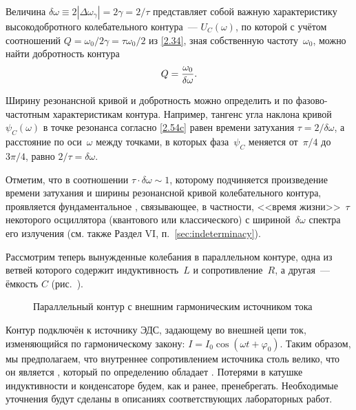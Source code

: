 Величина $\delta\omega\equiv2|\Delta\omega_{\gamma}|=2\gamma=2/\tau$
представляет собой важную характеристику высокодобротного колебательного
контура~---  $U_C(\omega)$, по которой с
учётом соотношений $Q=\omega_0/2\gamma=\tau\omega_0/2$ из \eqref{2.34}, зная
собственную частоту~$\omega_0$, можно найти добротность контура
\begin{equation}\eqmark{2.63}
Q=\dfrac{\omega_0}{\delta\omega}.
\end{equation}

Ширину резонансной кривой и добротность можно определить и по
фазово-частотным характеристикам контура. Например, тангенс угла наклона
кривой $\psi_C(\omega)$ в точке резонанса согласно \eqref{2.54c} равен времени
затухания $\tau=2/\delta\omega$, а расстояние по оси~$\omega$ между точками, в
которых фаза~$\psi_C$ меняется от~$\pi/4$ до~$3\pi/4$, равно
$2/\tau=\delta\omega$.

Отметим, что в соотношении $\tau\cdot\delta\omega\sim1$, которому
подчиняется произведение времени затухания и ширины резонансной кривой
колебательного контура, проявляется фундаментальное , связывающее, в частности, <<время жизни>>~$\tau$ 
некоторого осциллятора (квантового или классического) с шириной~$\delta\omega$ 
спектра его излучения (см. также Раздел VI, п.~\ref{sec:indeterminacy}).


\label{sec:ires}

Рассмотрим теперь вынужденные колебания в параллельном контуре, одна из ветвей
которого содержит индуктивность~$L$ и сопротивление~$R$, а другая~--- ёмкость
$C$ (рис.~).

\begin{figure}[h!]
		\centering
		\caption{Параллельный контур с внешним гармоническим источником тока}
\end{figure}

Контур подключён к источнику ЭДС, задающему во внешней цепи ток, изменяющийся по
гармоническому закону: $I=I_0\cos(\omega t+\varphi_0)$. Таким образом, мы
предполагаем, что внутреннее сопротивлением источника столь велико, что он
является , который по определению обладает
. Потерями в катушке
индуктивности и конденсаторе будем, как и ранее, пренебрегать. Необходимые
уточнения будут сделаны в описаниях соответствующих лабораторных работ.


